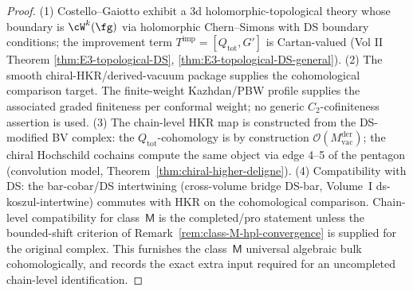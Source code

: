 \begin{proof}
(1) Costello--Gaiotto exhibit a 3d holomorphic-topological theory
whose boundary is $\cW^k(\fg)$ via holomorphic Chern--Simons with
DS boundary conditions; the improvement term
$T^{\mathrm{imp}}=[Q_{\mathrm{tot}},G']$ is Cartan-valued
(Vol II Theorem \ref{thm:E3-topological-DS}, \ref{thm:E3-topological-DS-general}).
(2) The smooth chiral-HKR/derived-vacuum package supplies the
cohomological comparison target.  The finite-weight Kazhdan/PBW
profile supplies the associated graded finiteness per conformal
weight; no generic \(C_2\)-cofiniteness assertion is used.
(3) The chain-level HKR map is constructed from the DS-modified
BV complex: the $Q_{\mathrm{tot}}$-cohomology is by construction
$\mathcal{O}(M_{\mathrm{vac}}^{\mathrm{der}})$; the chiral Hochschild
cochains compute the same object via edge 4--5 of the pentagon
(convolution model, Theorem~\ref{thm:chiral-higher-deligne}).
(4) Compatibility with DS: the bar-cobar/DS intertwining
(cross-volume bridge DS-bar, Volume~I ds-koszul-intertwine)
commutes with HKR on the cohomological comparison. Chain-level
compatibility for class~$\mathsf M$ is the completed/pro statement
unless the bounded-shift criterion of
Remark~\ref{rem:class-M-hpl-convergence} is supplied for the original
complex. This furnishes the class~$\mathsf M$ universal algebraic bulk
cohomologically, and records the exact extra input required for an
uncompleted chain-level identification.
\end{proof}

